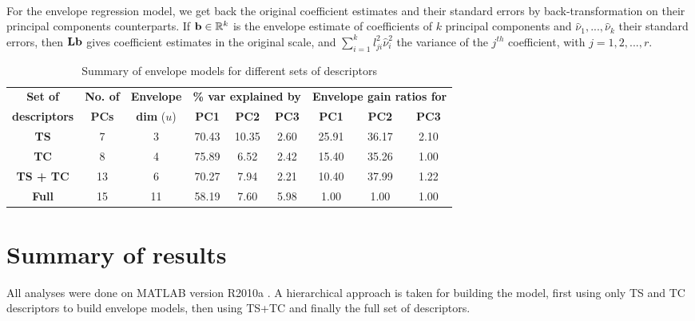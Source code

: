 \documentclass[8pt]{llncs}
\begin{document}
\begin{multicols}{2}
\paragraph{}For the envelope regression model, we get back the original coefficient estimates and their standard errors by back-transformation on their principal components counterparts. If ${\bf{b}}\in{\mathbb{R}}^k$ is the envelope estimate of coefficients of $k$ principal components and $\hat\nu_1,...,\hat\nu_k$ their standard errors, then ${\mathbf{L}}{\bf{b}}$ gives coefficient estimates in the original scale, and $\sum_{i=1}^k l_{ji}^2\hat\nu_i^2$ the variance of the $j^{th}$ coefficient, with $j=1,2,...,r$.

\begin{table*}[ht]\centering
    \begin{tabular}{|c|c|c||c|c|c|c|c|c|}\hline
    \textbf{Set of} & \textbf{No. of} & \textbf{Envelope} &	\multicolumn{3}{c|}{\textbf{\% var explained by}}	& \multicolumn{3}{c|}{\textbf{Envelope gain ratios for}}\\\cline{4-9}
    \textbf{descriptors}                  & \textbf{PCs}                                                 & \textbf{dim} ($u$) & \textbf{PC1}	& \textbf{PC2}   & \textbf{PC3}  & \textbf{PC1}	& \textbf{PC2}   & \textbf{PC3}  \\\hline\hline
    \textbf{TS}                 & 7                                                 & 3                        & 70.43 & 10.35 & 2.60 & 25.91              & 36.17 & 2.10 \\ \hline
    \textbf{TC}                 & 8                                                 & 4                        & 75.89 & 6.52  & 2.42 & 15.40              & 35.26 & 1.00 \\\hline
    \textbf{TS + TC}            & 13                                                & 6                        & 70.27 & 7.94  & 2.21 & 10.40              & 37.99 & 1.22 \\\hline
    \textbf{Full} & 15 & 11 & 58.19 & 7.60 & 5.98 & 1.00 & 1.00 & 1.00 \\\hline
    \end{tabular}
    \caption{Summary of envelope models for different sets of descriptors}
\end{table*}

\section{Summary of results}
All analyses were done on MATLAB version R2010a \cite{matlab}. A hierarchical approach is taken for building the model, first using only TS and TC descriptors to build envelope models, then using TS+TC and finally the full set of descriptors.


\end{multicols}
\end{document}
